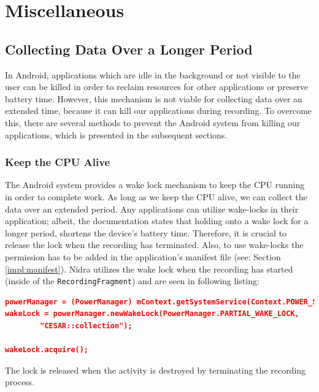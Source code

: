 

\section{Miscellaneous}

\subsection{Collecting Data Over a Longer Period}
In Android, applications which are idle in the background or not visible to the user can be killed in order to reclaim resources for other applications or preserve battery time. However, this mechanism is not viable for collecting data over an extended time, because it can kill our applications during recording. To overcome this, there are several methods to prevent the Android system from killing our applications, which is presented in the subsequent sections.

\subsubsection{Keep the CPU Alive}
The Android system provides a wake lock mechanism to keep the CPU running in order to complete work. As long as we keep the CPU alive, we can collect the data over an extended period. Any applications can utilize wake-locks in their application; albeit, the documentation states that holding onto a wake lock for a longer period, shortens the device's battery time. Therefore, it is crucial to release the lock when the recording has terminated. Also, to use wake-locks the permission has to be added in the application's manifest file (see: Section \ref{impl:manifest}). Nidra utilizes the wake lock when the recording has started (inside of the \verb|RecordingFragment|) and are seen in following listing:

\begin{lstlisting}[language=json, caption={}, captionpos=b]
powerManager = (PowerManager) mContext.getSystemService(Context.POWER_SERVICE);
wakeLock = powerManager.newWakeLock(PowerManager.PARTIAL_WAKE_LOCK,
        "CESAR::collection");

wakeLock.acquire();
\end{lstlisting}
The lock is released when the activity is destroyed by terminating the recording process.


